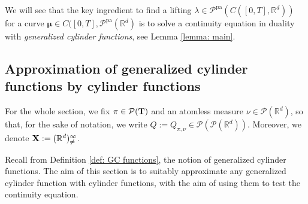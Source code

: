 \documentclass[10pt,leqno]{amsart}
\numberwithin{equation}{section}
\newtheorem{df}[teorema]{Definition}
\newcommand{\R}{\mathbb{R}}
\newcommand{\Q}{\mathbb{Q}}
\newcommand{\N}{\mathbb{N}}
\newcommand{\PP}{\mathcal{P}}
\newcommand{\PPpa}{\PP^{\operatorname{pa}}}
\renewcommand{\Q}{Q}
\begin{document}
We will see that the key ingredient to find a lifting $\lambda \in \PPpa(C([0,T],\R^d))$ for a curve $\boldsymbol{\mu} \in C([0,T],\PPpa(\R^d)$ is to solve a continuity equation in duality with \textit{generalized cylinder functions}, see Lemma \ref{lemma: main}.












\subsection{Approximation of generalized cylinder functions by cylinder functions}
For the whole section, we fix $\pi\in \PP(\bold{T})$ and an atomless measure $\nu\in \PP(\R^d)$, so that, for the sake of notation, we write $\Q:= \Q_{\pi,\nu} \in \PP(\PP(\R^d))$. Moreover, we denote $\bold{X} := (\R^d)^\infty_{\neq}$. 

Recall from Definition \ref{def: GC functions}, the notion of generalized cylinder functions. The aim of this section is to suitably approximate any generalized cylinder function with cylinder functions, with the aim of using them to test the continuity equation.

\end{document}
